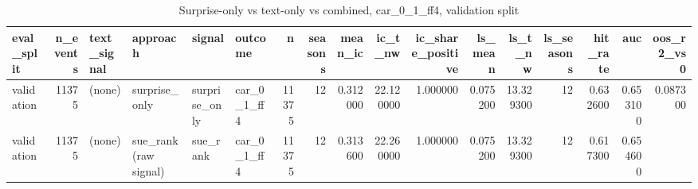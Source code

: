 \begin{table}
\caption{Surprise-only vs text-only vs combined, car_0_1_ff4, validation split}
\label{tab:t7_compare__car_0_1_ff4__validation}
\begin{tabular}{lrllllrrrrrrrrrrr}
\toprule
eval\_split & n\_events & text\_signal & approach & signal & outcome & n & seasons & mean\_ic & ic\_t\_nw & ic\_share\_positive & ls\_mean & ls\_t\_nw & ls\_seasons & hit\_rate & auc & oos\_r2\_vs0 \\
\midrule
validation & 11375 & (none) & surprise\_only & surprise\_only & car\_0\_1\_ff4 & 11375 & 12 & 0.312000 & 22.120000 & 1.000000 & 0.075200 & 13.329300 & 12 & 0.632600 & 0.653100 & 0.087300 \\
validation & 11375 & (none) & sue\_rank (raw signal) & sue\_rank & car\_0\_1\_ff4 & 11375 & 12 & 0.313600 & 22.260000 & 1.000000 & 0.075200 & 13.329300 & 12 & 0.617300 & 0.654600 &  \\
\bottomrule
\end{tabular}
\end{table}

